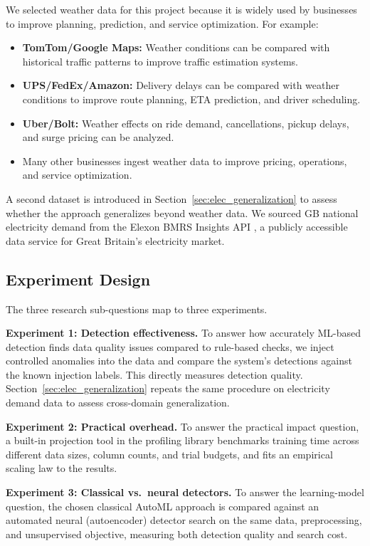 \documentclass[12pt]{article}
\begin{document}
We selected weather data for this project because it is widely used by businesses to improve planning, prediction, and service optimization. For example:
\begin{itemize}
  \item \textbf{TomTom/Google Maps:} Weather conditions can be compared with historical traffic patterns to improve traffic estimation systems.
  \item \textbf{UPS/FedEx/Amazon:} Delivery delays can be compared with weather conditions to improve route planning, ETA prediction, and driver scheduling.
  \item \textbf{Uber/Bolt:} Weather effects on ride demand, cancellations, pickup delays, and surge pricing can be analyzed.
  \item Many other businesses ingest weather data to improve pricing, operations, and service optimization.
\end{itemize}

A second dataset is introduced in Section~\ref{sec:elec_generalization} to assess whether the approach generalizes beyond weather data. We sourced GB national electricity demand from the Elexon BMRS Insights API \cite{elexonbmrs2026}, a publicly accessible data service for Great Britain's electricity market.

\subsection{Experiment Design}

The three research sub-questions map to three experiments.

\textbf{Experiment 1: Detection effectiveness.} To answer how accurately ML-based detection finds data quality issues compared to rule-based checks, we inject controlled anomalies into the data and compare the system's detections against the known injection labels. This directly measures detection quality. Section~\ref{sec:elec_generalization} repeats the same procedure on electricity demand data to assess cross-domain generalization.

\textbf{Experiment 2: Practical overhead.} To answer the practical impact question, a built-in projection tool in the profiling library benchmarks training time across different data sizes, column counts, and trial budgets, and fits an empirical scaling law to the results.

\textbf{Experiment 3: Classical vs.\ neural detectors.} To answer the learning-model question, the chosen classical AutoML approach is compared against an automated neural (autoencoder) detector search on the same data, preprocessing, and unsupervised objective, measuring both detection quality and search cost.
\end{document}

